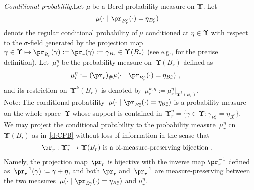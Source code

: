 \documentclass[11pt,letterpaper]{amsart}
\newcommand{\A}{\Sigma} %
\newcommand{\comma}{\,\,\mathrm{,}\;\,}
\newcommand{\fstop}{\,\,\mathrm{.}}
\newcommand{\dUpsilon}{{\mathbf \Upsilon}}
\newcommand{\U}{\dUpsilon}
\renewcommand{\1}{\mathbf 1}
\renewcommand{\msE}{\mathscr K}
\numberwithin{equation}{section}
\theoremstyle{plain}
\newtheorem{prop}[thm]{Proposition}%
\theoremstyle{definition}
\theoremstyle{remark}
\renewcommand{\paragraph}[1]{\medskip\emph{#1}.\quad}
\begin{document}
\paragraph{Conditional probability}Let $\mu$ be a Borel probability measure on $\U$. 
Let 
$$\mu(\cdot \ | \ \pr_{B_r^c}(\cdot)=\eta_{B_r^c})$$ denote the regular conditional probability of $\mu$ conditioned at $\eta \in \U$ with respect to the $\sigma$-field generated by the projection map $\gamma \in \U \mapsto \pr_{B_r}(\gamma):=\pr_r(\gamma):=\gamma_{B_r} \in \U(B_r)$ (see e.g., \cite[Def.~3.32]{LzDSSuz21} for the precise definition).  Let~$\mu_{r}^\eta$ be the probability measure on~$\U(B_r)$ defined as 
\begin{align} \label{d:CPB}
\mu_{r}^\eta:=(\pr_{r})_\#\mu(\cdot \ | \ \pr_{B_r^c}(\cdot)=\eta_{B_r^c}) \comma
\end{align}
and its restriction on~$\U^k(B_r)$ is denoted by~$\mu_{r}^{k, \eta}:=\mu_{r}^\eta|_{\U^k(B_r)}$.
\vspace{2mm}\\
{\sf Note}: The conditional probability~$\mu(\cdot \ | \ \pr_{B_r^c}(\cdot)=\eta_{B_r^c})$ is a probability measure on the whole space~$\U$ whose support is contained in~$\U_r^\eta=\{\gamma \in \U: \gamma_{B_r^c}=\eta_{B_r^c}\}$. 
We may project the conditional probability to the probability measure~$\mu_r^\eta$ on $\U(B_r)$ as in~\eqref{d:CPB} without loss of information in the sense that  
\begin{align} \label{r:BMP}
\pr_r: \U_r^\eta \to \U(B_r) \ \text{is  a bi-measure-preserving bijection} \fstop
\end{align}
Namely, the projection map~$\pr_r$ is bijective with the inverse map $\pr_r^{-1}$ defined as~$\pr^{-1}_r(\gamma):=\gamma+\eta$, and both $\pr_r$ and~$\pr_r^{-1}$ are measure-preserving between the two measures~$\mu(\cdot \ | \ \pr_{B_r^c}(\cdot)=\eta_{B_r^c})$ and $\mu_{r}^\eta$.  
\smallskip
\end{document}

